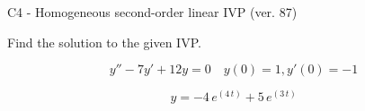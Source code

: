 \begin{exercise}
  \begin{exerciseTitle}C4 - Homogeneous second-order linear IVP (ver. 87)\end{exerciseTitle}
  \begin{exerciseStatement}
    
Find the solution to the given IVP.

    
\[y''-7y'+12y = 0 \hspace{1em} y(0) = 1 , y'(0) = -1\]

  \end{exerciseStatement}
  \begin{exerciseAnswer}
    
\[y= -4 \, e^{\left(4 \, t\right)} + 5 \, e^{\left(3 \, t\right)}\]

  \end{exerciseAnswer}
\end{exercise}